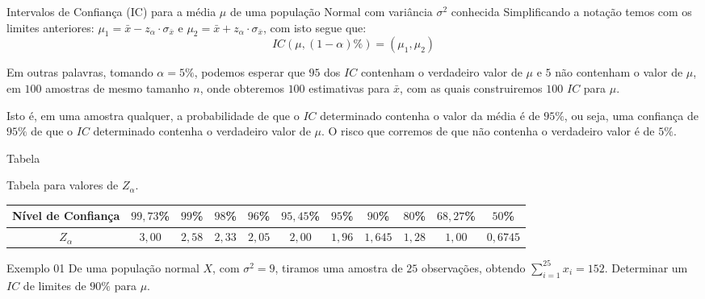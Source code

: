 \documentclass[hyperref={pdfpagelabels=false}]{beamer}
\begin{document}
\begin{frame}{Intervalos de Confiança (IC) para a média $\mu$ de uma população Normal com variância $\sigma^2$ conhecida}
	Simplificando a notação temos com os limites anteriores: $\mu_1 = \bar{x}-z_\alpha\cdot \sigma_{\bar{x}} $ e $\mu_2 = \bar{x}+z_\alpha\cdot \sigma_{\bar{x}}$, com isto segue que:
	$$IC(\mu,(1-\alpha)\%) = (\mu_1,\mu_2)$$
	\pause
	
	Em outras palavras, tomando $\alpha = 5\%$, podemos esperar que $95$ dos $IC$ contenham o verdadeiro valor de $\mu$ e $5$ não contenham o valor de $\mu$, em $100$ amostras de mesmo tamanho $n$, onde obteremos $100$ estimativas para $\bar{x}$, com as quais construiremos $100$ $IC$ para $\mu$.
	\pause
	
	Isto é, em uma amostra qualquer, a probabilidade de que o $IC$ determinado contenha o valor da média é de $95\%$, ou seja, uma confiança de $95\%$ de que o $IC$ determinado contenha o verdadeiro valor de $\mu$. O risco que corremos de que não contenha o verdadeiro valor é de $5\%$.
\end{frame}

\begin{frame}{Tabela}
	\begin{center}
		Tabela para valores de $Z_{\alpha}$.
		\begin{table}[h]
			\tiny
			\begin{tabular}{|c|cccccccccc|}
				\hline
				Nível de Confiança	& $99,73$\% & $99$\% & $98$\% & $96$\% & $95,45$\% & $95$\% & $90$\% & $80$\% & $68,27$\% & $50$\% \\ \hline
				$Z_{\alpha}$	& $3,00$ & $2,58$ & $2,33$ & $2,05$ & $2,00$ & $1,96$ & $1,645$ & $1,28$ & $1,00$ & $0,6745$ \\ \hline
			\end{tabular}
		\end{table}
	\end{center}
\end{frame}

\begin{frame}{Exemplo 01}
	De uma população normal $X$, com $\sigma^2 = 9$, tiramos uma amostra de $25$ observações, obtendo $\displaystyle \sum_{i=1}^{25}x_i = 152$. Determinar um $IC$ de limites de $90\%$ para $\mu$.
	
\end{frame}
\end{document}
